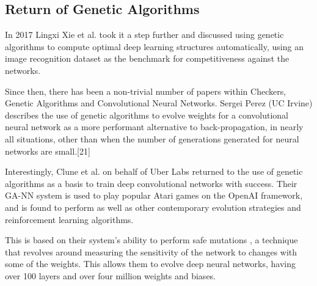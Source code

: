 \documentclass[12pt,a4paper]{article}
\begin{document}

    \subsection{Return of Genetic Algorithms}
        In 2017 Lingxi Xie et al. took it a step further and discussed using genetic algorithms to compute optimal deep learning structures automatically, using an image recognition dataset as the benchmark for competitiveness against the networks.\cite{xie_genetic_2017}

        Since then, there has been a non-trivial number of papers within Checkers, Genetic Algorithms and Convolutional Neural Networks. Sergei Perez (UC Irvine) describes the use of genetic algorithms to evolve weights for a convolutional neural network as a more performant alternative to back-propagation, in nearly all situations, other than when the number of generations generated for neural networks are small.[21]

        Interestingly, Clune et al. on behalf of Uber Labs returned to the use of genetic algorithms as a basis to train deep convolutional networks with success. \cite{such_deep_2017} Their GA-NN system is used to play popular Atari games on the OpenAI framework, and is found to perform as well as other contemporary evolution strategies and reinforcement learning algorithms. 

        This is based on their system's ability to perform safe mutations \cite{lehman_safe_2017}, a technique that revolves around measuring the sensitivity of the network to changes with some of the weights. This allows them to evolve deep neural networks, having over 100 layers and over four million weights and biases.  

\end{document}

